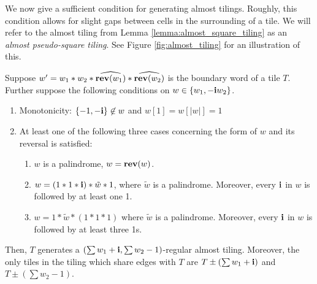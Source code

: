 \documentclass[12pt]{amsart}
\begin{document}
We now give a sufficient condition for generating almost tilings. 
Roughly, this condition allows for slight gaps between cells in the surrounding of a tile. 
We will refer to the almost tiling from Lemma \ref{lemma:almost_square_tiling} as an {\it almost pseudo-square tiling}. See Figure \ref{fig:almost_tiling}
for an illustration of this. 
\begin{lemma}\label{lemma:almost_square_tiling}
	Suppose	$w' = w_1 * w_2 * \widehat{\mathop{\bf rev}(w_1)} * \widehat{\mathop{\bf rev}(w_2)}$ is the boundary word of a tile $T$. 
	Further suppose the following conditions on $w \in \{ w_1, -\mathbf{i} w_2\}$.
	\begin{enumerate}
		\item 
		Monotonicity: $\{-1, -\mathbf{i}\} \not \in w$
		and $w[1] = w[|w|] = 1$
		\item At least one of the following three cases concerning the form of $w$ and its reversal is satisfied:
		\begin{enumerate}
			\item $w$ is a palindrome, $w = \mathop{\bf rev}(w)$.			
			
			\item $w = (1*1*\mathbf{i}) * \tilde{w} * 1$, where $\tilde{w}$ is a palindrome.
			Moreover, every $\mathbf{i}$ in $w$ is followed by at least one 1.
			
			\item $w = 1*\tilde{w}*(1*1*1)$ where $\tilde{w}$ is a palindrome. 
			Moreover, every $\mathbf{i}$ in $w$ is followed by at least three 1s.
			
		\end{enumerate}
	\end{enumerate}
	
	Then, $T$ generates a $(\sum w_1+\mathbf{i}, \sum w_2-1)$-regular almost tiling. Moreover, the only tiles in the tiling which share 
	edges with $T$ are $T \pm (\sum w_1+\mathbf{i})$ and $T \pm (\sum w_2 - 1)$. 
\end{lemma}
\end{document}
